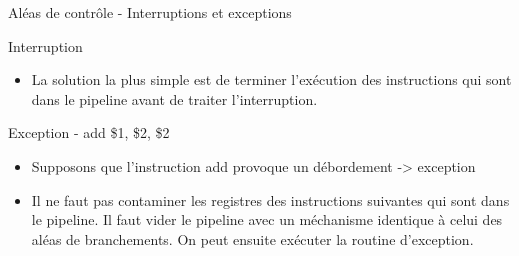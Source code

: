 %
\begin{Frame}{Aléas de contrôle - Interruptions et exceptions}

\begin{block}{Interruption}
       \begin{center}
 	\begin{itemize}
          \item La solution la plus simple est de terminer l'exécution des instructions qui sont dans le pipeline avant de traiter l'interruption.
        \end{itemize}
       \end{center}
      \end{block}   

 

\begin{block}{Exception - add \$1, \$2, \$2}
       \begin{center}
 	\begin{itemize}
         \item Supposons que l'instruction add provoque un débordement -> exception
	 \item Il ne faut pas contaminer les registres des instructions suivantes qui sont dans le pipeline. Il faut vider le pipeline avec un méchanisme identique à celui des aléas de branchements. On peut ensuite exécuter la routine d'exception.
	
        \end{itemize}
       \end{center}
      \end{block}   

\end{Frame}


